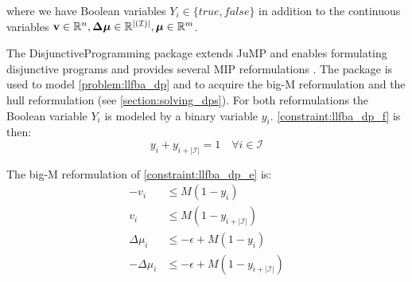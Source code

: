 \quad where we have Boolean variables $Y_i \in \{true, false \}$ in addition to the continuous variables $\bold v \in \mathbb{R}^n, \boldsymbol{\Delta \mu} \in \mathbb{R}^{| (\mathcal{I})|}, \boldsymbol \mu \in \mathbb{R}^m$. %

The \textsf{DisjunctiveProgramming} package extends \textsf{JuMP} and enables formulating disjunctive programs and provides several MIP reformulations \cite{perez_disjunctiveprogrammingjl_2023}
. The package is used to model \cref{problem:llfba_dp} and to acquire the big-M reformulation and the hull reformulation (see \cref{section:solving_dps}). For both reformulations the Boolean variable $Y_i$ is modeled by a binary variable $y_i$. \cref{constraint:llfba_dp_f} is then:
\begin{equation*}
    y_i + y_{i + |\mathcal{I}|} = 1 \quad \forall i \in \mathcal{I}
\end{equation*}

The big-M reformulation of \cref{constraint:llfba_dp_e} is:
\begin{align*}
    -v_i &\leq M (1 - y_i) \\
    v_i &\leq M (1- y_{i + |\mathcal{I}|}) \\
    \Delta \mu_i &\leq -\epsilon + M (1 - y_i) \\ 
    - \Delta \mu_i &\leq -\epsilon + M(1 - y_{i + |\mathcal{I}|})
\end{align*}

